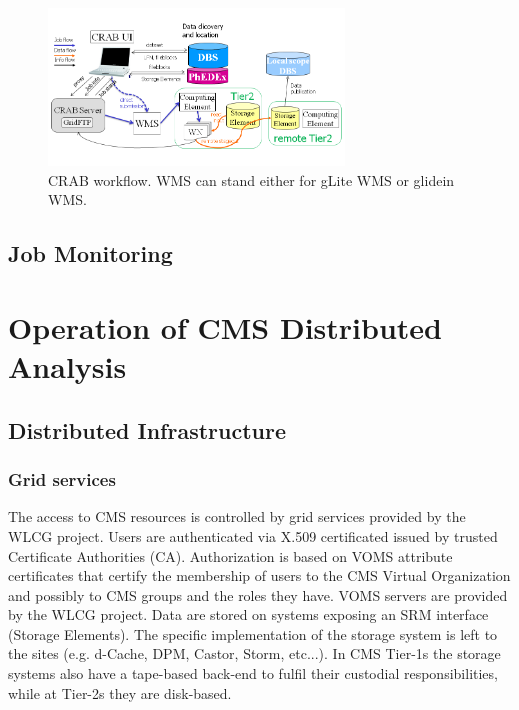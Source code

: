 \begin{figure}
 \includegraphics[width=0.70\textwidth]{figures/CRABWorkflow.png}
\caption{CRAB workflow. WMS can stand either for gLite WMS or glidein WMS.}
\label{fig:CRABWorkflow}
\end{figure}

\subsection{Job Monitoring}
\label{sec:3_3}


\section{Operation of CMS Distributed Analysis}
\label{sec:4}
\subsection{Distributed Infrastructure}
\label{sec:4_1}

\subsubsection{ Grid services }
\label{sec:4_1_1}

The access to CMS resources is controlled by grid services provided by the WLCG project.
Users are authenticated via X.509 certificated issued by trusted Certificate Authorities (CA).
Authorization is based on VOMS attribute certificates that certify the membership of users
to the CMS Virtual Organization and possibly to CMS groups and the roles they have.
VOMS servers are provided by the WLCG project.
Data are stored on systems exposing an SRM interface (Storage Elements).
The specific implementation of the storage system is left to the sites
(e.g. d-Cache, DPM, Castor, Storm, etc...). In CMS Tier-1s the storage
systems also have a tape-based back-end to fulfil their custodial
responsibilities, while at Tier-2s they are disk-based.

